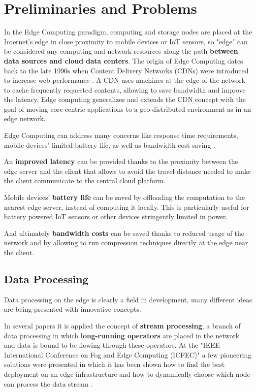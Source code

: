 \section{Preliminaries and Problems}
\label{sec:preliminaries_and_open_problems}

In the Edge Computing paradigm, computing and storage nodes are placed at the Internet’s edge in close proximity to mobile devices or IoT sensors, so "edge" can be considered any computing and network resources along the path \textbf{between data sources and cloud data centers}.
The origin of Edge Computing dates back to the late 1990s when Content Delivery Networks (CDNs) were introduced to increase web performance \cite{edge-computing-origin}. A CDN uses machines at the edge of the network to cache frequently requested contents, allowing to save bandwidth and improve the latency. Edge computing generalizes and extends the CDN concept with the goal of moving core-centric applications to a geo-distributed environment as in an edge network.

Edge Computing can address many concerns like response time requirements, mobile devices' limited battery life, as well as bandwidth cost saving \cite{emergence-edge-computing}.

An \textbf{improved latency} can be provided thanks to the proximity between the edge server and the client that allows to avoid the travel-distance needed to make the client communicate to the central cloud platform.

Mobile devices' \textbf{battery life} can be saved by offloading the computation to the nearest edge server, instead of computing it locally. This is particularly useful for battery powered IoT sensors or other devices stringently limited in power.

And ultimately \textbf{bandwidth costs} can be saved thanks to reduced usage of the network and by allowing to run compression techniques directly at the edge near the client.


\subsection{Data Processing}
Data processing on the edge is clearly a field in development, many different ideas are being presented with innovative concepts.

In several papers it is applied the concept of \textbf{stream processing}, a branch of data processing in which \textbf{long-running operators} are placed in the network and data is bound to be flowing through these operators.
At the "IEEE International Conference on Fog and Edge Computing (ICFEC)" a few pioneering solutions were presented in which it has been shown how to find the best deployment on an edge infrastructure \cite{how-to-deploy-fog-applications} \cite{optimal-placement-stream} and how to dynamically choose which node can process the data stream \cite{data-driven-stream}.

